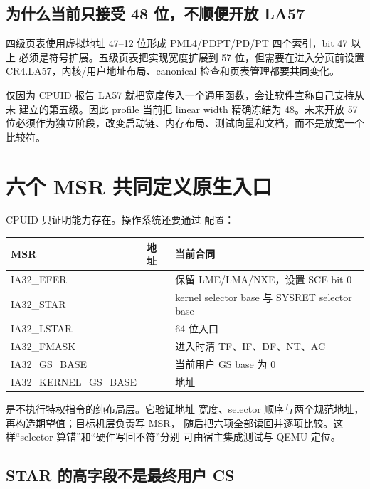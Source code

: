 \subsection{为什么当前只接受 48 位，不顺便开放 LA57}

四级页表使用虚拟地址 47--12 位形成 PML4/PDPT/PD/PT 四个索引，bit 47 以上
必须是符号扩展。五级页表把实现宽度扩展到 57 位，但需要在进入分页前设置
CR4.LA57，内核/用户地址布局、canonical 检查和页表管理都要共同变化。

仅因为 CPUID 报告 LA57 就把宽度传入一个通用函数，会让软件宣称自己支持从未
建立的第五级。因此 profile 当前把 linear width 精确冻结为 48。未来开放
57 位必须作为独立阶段，改变启动链、内存布局、测试向量和文档，而不是放宽一个
比较符。

\section{六个 MSR 共同定义原生入口}

CPUID 只证明能力存在。操作系统还要通过  配置：

\begin{longtable}{L{0.22\textwidth}L{0.17\textwidth}L{0.49\textwidth}}
\toprule
MSR & 地址 & 当前合同\\
\midrule
IA32\_EFER &  & 保留 LME/LMA/NXE，设置 SCE bit 0\\
IA32\_STAR &  & kernel selector base 与 SYSRET selector base\\
IA32\_LSTAR &  & 64 位入口 \\
IA32\_FMASK &  & 进入时清 TF、IF、DF、NT、AC\\
IA32\_GS\_BASE &  & 当前用户 GS base 为 0\\
IA32\_KERNEL\_GS\_BASE &  &  地址\\
\bottomrule
\end{longtable}

 是不执行特权指令的纯布局层。它验证地址
宽度、selector 顺序与两个规范地址，再构造期望值；目标机层负责写 MSR，
随后把六项全部读回并逐项比较。这样“selector 算错”和“硬件写回不符”分别
可由宿主集成测试与 QEMU 定位。

\subsection{STAR 的高字段不是最终用户 CS}

